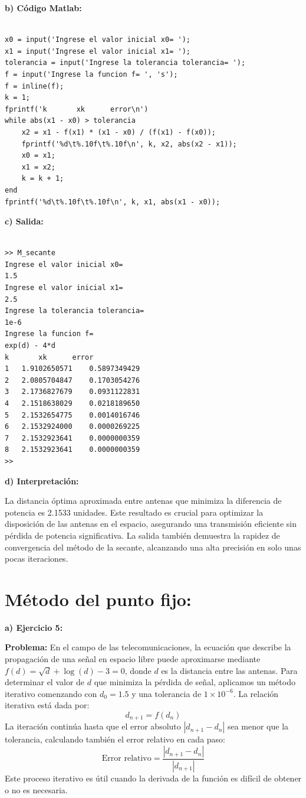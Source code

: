 \documentclass[12pt,a4paper,twoside]{article}  %
\begin{document}
\textbf{b) Código Matlab:}

\begin{lstlisting}

x0 = input('Ingrese el valor inicial x0= ');
x1 = input('Ingrese el valor inicial x1= ');
tolerancia = input('Ingrese la tolerancia tolerancia= ');
f = input('Ingrese la funcion f= ', 's');
f = inline(f);
k = 1;
fprintf('k       xk      error\n')
while abs(x1 - x0) > tolerancia
    x2 = x1 - f(x1) * (x1 - x0) / (f(x1) - f(x0));
    fprintf('%d\t%.10f\t%.10f\n', k, x2, abs(x2 - x1));
    x0 = x1;
    x1 = x2;
    k = k + 1;
end
fprintf('%d\t%.10f\t%.10f\n', k, x1, abs(x1 - x0));

\end{lstlisting}

\textbf{c) Salida:}

\begin{verbatim}

>> M_secante
Ingrese el valor inicial x0= 
1.5
Ingrese el valor inicial x1= 
2.5
Ingrese la tolerancia tolerancia= 
1e-6
Ingrese la funcion f= 
exp(d) - 4*d
k       xk      error
1	1.9102650571	0.5897349429
2	2.0805704847	0.1703054276
3	2.1736827679	0.0931122831
4	2.1518638029	0.0218189650
5	2.1532654775	0.0014016746
6	2.1532924000	0.0000269225
7	2.1532923641	0.0000000359
8	2.1532923641	0.0000000359
>> 

\end{verbatim}

\textbf{d) Interpretación:}

La distancia óptima aproximada entre antenas que minimiza la diferencia de potencia es 2.1533 unidades. Este resultado es crucial para optimizar la disposición de las antenas en el espacio, asegurando una transmisión eficiente sin pérdida de potencia significativa. La salida también demuestra la rapidez de convergencia del método de la secante, alcanzando una alta precisión en solo unas pocas iteraciones.


\section{Método del punto fijo: }

\textbf{a) Ejercicio 5: }

\textbf{Problema:} En el campo de las telecomunicaciones, la ecuación que describe la propagación de una señal en espacio libre puede aproximarse mediante \( f(d) = \sqrt{d} + \log(d) - 3 = 0 \), donde \( d \) es la distancia entre las antenas. Para determinar el valor de \( d \) que minimiza la pérdida de señal, aplicamos un método iterativo comenzando con \( d_0 = 1.5 \) y una tolerancia de \( 1 \times 10^{-6} \). La relación iterativa está dada por:
\[
d_{n+1} = f(d_n)
\]
La iteración continúa hasta que el error absoluto \( |d_{n+1} - d_n| \) sea menor que la tolerancia, calculando también el error relativo en cada paso:
\[
\text{Error relativo} = \frac{|d_{n+1} - d_n|}{|d_{n+1}|}
\]
Este proceso iterativo es útil cuando la derivada de la función es difícil de obtener o no es necesaria.
\end{document}
